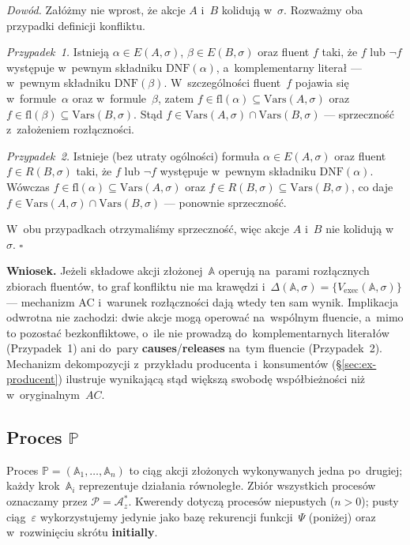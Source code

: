 \documentclass[11pt,a4paper]{article}
\newcommand{\causes}{\textbf{causes}}
\newcommand{\initially}{\textbf{initially}}
\newcommand{\releases}{\textbf{releases}}
\newcommand{\DNF}{\mathrm{DNF}}
\theoremstyle{definition}
\begin{document}
\medskip
\noindent \textit{Dowód.}
Załóżmy nie wprost, że akcje $A$ i~$B$ kolidują w~$\sigma$. Rozważmy
oba przypadki definicji konfliktu.

\emph{Przypadek~1.} Istnieją $\alpha \in E(A,\sigma)$, $\beta \in E(B,\sigma)$
oraz fluent $f$ taki, że $f$ lub $\neg f$ występuje w~pewnym składniku
$\DNF(\alpha)$, a~komplementarny literał --- w~pewnym składniku
$\DNF(\beta)$. W~szczególności fluent~$f$ pojawia się w~formule~$\alpha$
oraz w~formule~$\beta$, zatem $f \in \mathrm{fl}(\alpha) \subseteq
\mathrm{Vars}(A,\sigma)$ oraz $f \in \mathrm{fl}(\beta) \subseteq
\mathrm{Vars}(B,\sigma)$. Stąd $f \in \mathrm{Vars}(A,\sigma) \cap
\mathrm{Vars}(B,\sigma)$ --- sprzeczność z~założeniem rozłączności.

\emph{Przypadek~2.} Istnieje (bez utraty ogólności) formuła
$\alpha \in E(A,\sigma)$ oraz fluent $f \in R(B,\sigma)$ taki, że
$f$ lub $\neg f$ występuje w~pewnym składniku $\DNF(\alpha)$.
Wówczas $f \in \mathrm{fl}(\alpha) \subseteq \mathrm{Vars}(A,\sigma)$
oraz $f \in R(B,\sigma) \subseteq \mathrm{Vars}(B,\sigma)$, co daje
$f \in \mathrm{Vars}(A,\sigma) \cap \mathrm{Vars}(B,\sigma)$ ---
ponownie sprzeczność.

\noindent W~obu przypadkach otrzymaliśmy sprzeczność, więc akcje $A$
i~$B$ nie kolidują w~$\sigma$. \hfill$\square$

\medskip
\noindent \textbf{Wniosek.}
Jeżeli składowe akcji złożonej~$\mathbb{A}$ operują na~parami rozłącznych zbiorach
fluentów, to graf konfliktu nie ma krawędzi i~$\Delta(\mathbb{A},\sigma) =
\{V_{\mathrm{exec}}(\mathbb{A},\sigma)\}$ --- mechanizm AC i~warunek rozłączności dają
wtedy ten sam wynik. Implikacja odwrotna nie zachodzi: dwie akcje mogą operować na~wspólnym
fluencie, a~mimo to pozostać bezkonfliktowe, o~ile nie prowadzą do~komplementarnych literałów
(Przypadek~1) ani do~pary \causes{}/\releases{} na~tym fluencie (Przypadek~2). Mechanizm
dekompozycji z~przykładu producenta i~konsumentów (\S\ref{sec:ex-producent}) ilustruje
wynikającą stąd większą swobodę współbieżności niż w~oryginalnym~$AC$.

\subsection{Proces \texorpdfstring{$\mathbb{P}$}{P}}
\label{sec:proces}

Proces $\mathbb{P} = (\mathbb{A}_1, \ldots, \mathbb{A}_n)$ to ciąg akcji złożonych
wykonywanych jedna po~drugiej; każdy krok~$\mathbb{A}_i$ reprezentuje działania równoległe.
Zbiór wszystkich procesów oznaczamy przez $\mathcal{P} = \mathcal{A}_z^*$. Kwerendy dotyczą
procesów niepustych ($n>0$); pusty ciąg~$\varepsilon$ wykorzystujemy jedynie jako bazę
rekurencji funkcji~$\Psi$ (poniżej) oraz w~rozwinięciu skrótu \initially{}.
\end{document}

